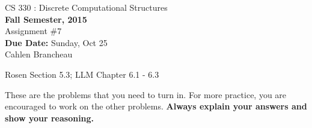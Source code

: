 \setlength{\oddsidemargin}{12pt}
\setlength{\textwidth}{6.5in}
\setlength{\textheight}{9in}
\pagestyle{empty}
\setlength{\parskip}{7pt plus 2pt minus 2pt}



\begin{center}
{{\large CS 330 : Discrete Computational Structures}}\\


{\bf Fall Semester, 2015}\\

{\sc Assignment \#7}\\
{\bf Due Date:}  Sunday, Oct 25\\
Cahlen Brancheau
\end{center}

 Rosen Section 5.3; LLM Chapter 6.1 - 6.3

These are the problems that you need to turn in. For more
practice, you are encouraged to work on the other problems. {\bf Always
explain your answers and show your reasoning.}

